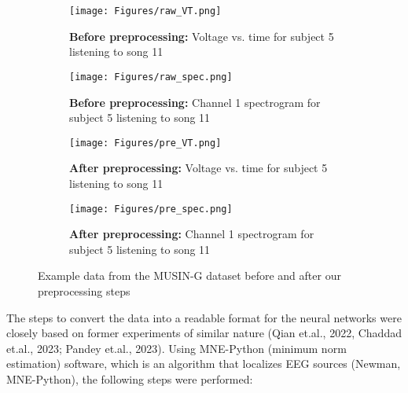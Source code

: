 \documentclass[fleqn,10pt]{SelfArx} %
\begin{document}
\begin{figure*}
    \centering
    \begin{subfigure}[b]{0.45\linewidth} %
        \centering
        \texttt{[image: Figures/raw\_VT.png]}
        \caption{\textbf{Before preprocessing:} Voltage vs. time for subject 5 listening to song 11}
        \label{fig:raw_VT}
    \end{subfigure}%
    \begin{subfigure}[b]{0.45\linewidth} %
        \centering
        \texttt{[image: Figures/raw\_spec.png]} %
        \caption{\textbf{Before preprocessing:} Channel 1 spectrogram for subject 5 listening to song 11}
        \label{fig:raw_spec}
    \end{subfigure}
    \begin{subfigure}[b]{0.45\linewidth} %
        \centering
        \texttt{[image: Figures/pre\_VT.png]} %
        \caption{\textbf{After preprocessing:} Voltage vs. time for subject 5 listening to song 11}
        \label{fig:pre_VT}
    \end{subfigure}
    \begin{subfigure}[b]{0.45\linewidth} %
        \centering
        \texttt{[image: Figures/pre\_spec.png]} %
        \caption{\textbf{After preprocessing:} Channel 1 spectrogram for subject 5 listening to song 11}
        \label{fig:pre_spec}
    \end{subfigure}
    \caption{Example data from the MUSIN-G dataset before and after our preprocessing steps}
    \label{fig:data_processing}
\end{figure*}

The steps to convert the data into a readable format for the neural networks were closely based on former experiments of similar nature (Qian et.al., 2022, Chaddad et.al., 2023; Pandey et.al., 2023). Using MNE-Python (minimum norm estimation) software, which is an algorithm that localizes EEG sources (Newman, MNE-Python), the following steps were performed:
\end{document}

